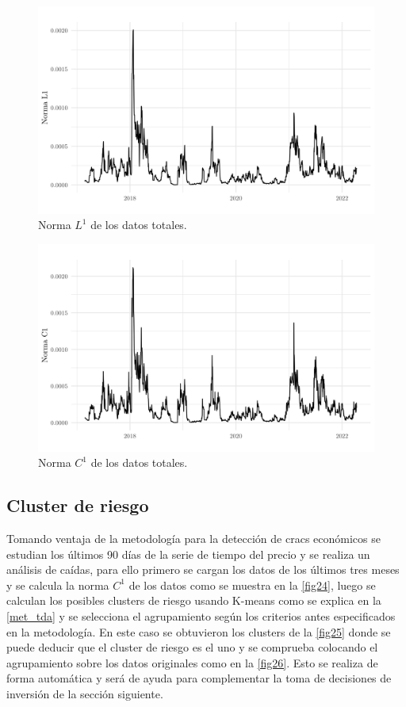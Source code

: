 \begin{figure}
	\centering
	\includegraphics[scale=0.3]{Chapter5/norm_l1.png}
	\caption{Norma $L^1$ de los datos totales.}
	\label{fig22}
\end{figure}

\begin{figure}
	\centering
	\includegraphics[scale=0.3]{Chapter5/norm_c1.png}
	\caption{Norma $C^1$ de los datos totales.}
	\label{fig23}
\end{figure}

\subsection{Cluster de riesgo}

Tomando ventaja de la metodología para la detección de cracs económicos se estudian los últimos 90 días de la serie de tiempo del precio y se realiza un análisis de caídas, para ello primero se cargan los datos de los últimos tres meses y se calcula la norma $C^1$ de los datos como se muestra en la \cref{fig24}, luego se calculan los posibles clusters de riesgo usando K-means como se explica en la \cref{met_tda} y se selecciona el agrupamiento según los criterios antes especificados en la metodología. En este caso se obtuvieron los clusters de la \cref{fig25} donde se puede deducir que el cluster de riesgo es el uno y se comprueba colocando el agrupamiento sobre los datos originales como en la \cref{fig26}. Esto se realiza de forma automática y será de ayuda para complementar la toma de decisiones de inversión de la sección siguiente.

